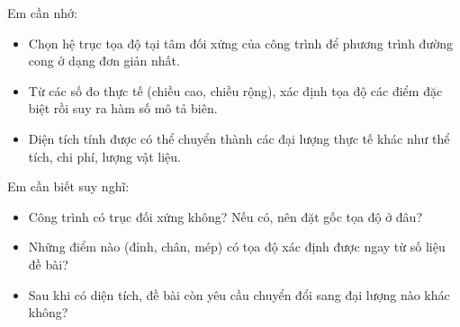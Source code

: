 \begin{hoptongket}
Em cần nhớ:
\begin{itemize}[leftmargin=1cm]
  \item Chọn hệ trục tọa độ tại tâm đối xứng của công trình để phương trình đường cong ở dạng đơn giản nhất.
  \item Từ các số đo thực tế (chiều cao, chiều rộng), xác định tọa độ các điểm đặc biệt rồi suy ra hàm số mô tả biên.
  \item Diện tích tính được có thể chuyển thành các đại lượng thực tế khác như thể tích, chi phí, lượng vật liệu.
\end{itemize}
Em cần biết suy nghĩ:
\begin{itemize}[leftmargin=1cm]
  \item Công trình có trục đối xứng không? Nếu có, nên đặt gốc tọa độ ở đâu?
  \item Những điểm nào (đỉnh, chân, mép) có tọa độ xác định được ngay từ số liệu đề bài?
  \item Sau khi có diện tích, đề bài còn yêu cầu chuyển đổi sang đại lượng nào khác không?
\end{itemize}
\end{hoptongket}

\newpage


\newpage
